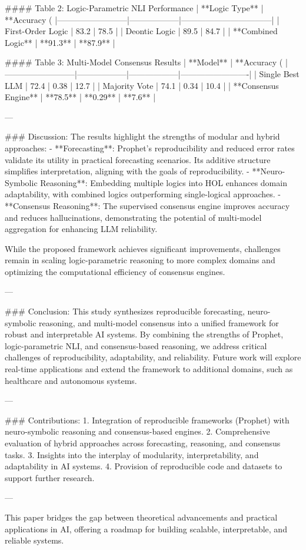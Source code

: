 #### Table 2: Logic-Parametric NLI Performance
| **Logic Type**           | **Accuracy (%
|--------------------------|------------------|---------------------------------|
| First-Order Logic        | 83.2            | 78.5                           |
| Deontic Logic            | 89.5            | 84.7                           |
| **Combined Logic**       | **91.3**        | **87.9**                       |

#### Table 3: Multi-Model Consensus Results
| **Model**               | **Accuracy (%
|--------------------------|------------------|------------------|-------------------------|
| Single Best LLM         | 72.4            | 0.38            | 12.7                   |
| Majority Vote           | 74.1            | 0.34            | 10.4                   |
| **Consensus Engine**    | **78.5**        | **0.29**        | **7.6**                |

---

### Discussion:
The results highlight the strengths of modular and hybrid approaches:
- **Forecasting**: Prophet's reproducibility and reduced error rates validate its utility in practical forecasting scenarios. Its additive structure simplifies interpretation, aligning with the goals of reproducibility.
- **Neuro-Symbolic Reasoning**: Embedding multiple logics into HOL enhances domain adaptability, with combined logics outperforming single-logical approaches.
- **Consensus Reasoning**: The supervised consensus engine improves accuracy and reduces hallucinations, demonstrating the potential of multi-model aggregation for enhancing LLM reliability.

While the proposed framework achieves significant improvements, challenges remain in scaling logic-parametric reasoning to more complex domains and optimizing the computational efficiency of consensus engines.

---

### Conclusion:
This study synthesizes reproducible forecasting, neuro-symbolic reasoning, and multi-model consensus into a unified framework for robust and interpretable AI systems. By combining the strengths of Prophet, logic-parametric NLI, and consensus-based reasoning, we address critical challenges of reproducibility, adaptability, and reliability. Future work will explore real-time applications and extend the framework to additional domains, such as healthcare and autonomous systems.

---

### Contributions:
1. Integration of reproducible frameworks (Prophet) with neuro-symbolic reasoning and consensus-based engines.
2. Comprehensive evaluation of hybrid approaches across forecasting, reasoning, and consensus tasks.
3. Insights into the interplay of modularity, interpretability, and adaptability in AI systems.
4. Provision of reproducible code and datasets to support further research.

--- 

This paper bridges the gap between theoretical advancements and practical applications in AI, offering a roadmap for building scalable, interpretable, and reliable systems.